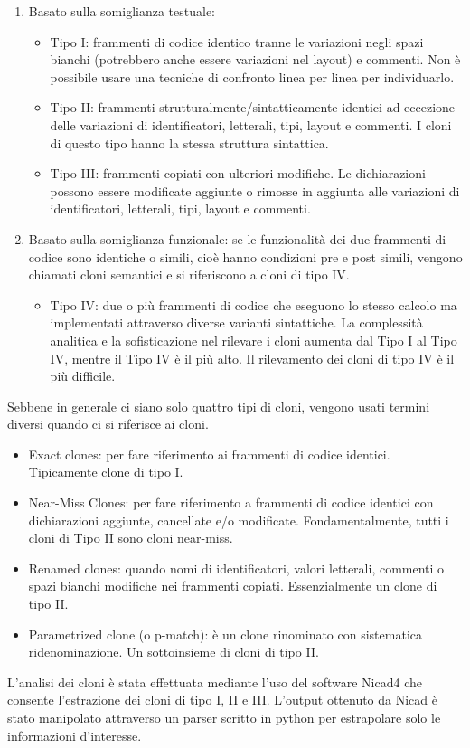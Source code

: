 \begin{enumerate}
\item Basato sulla somiglianza testuale:
\begin{itemize}
\item	Tipo I: frammenti di codice identico tranne le variazioni negli spazi bianchi (potrebbero anche essere variazioni nel layout) e commenti. Non è possibile usare una tecniche di confronto linea per linea per individuarlo.
\item	Tipo II: frammenti strutturalmente/sintatticamente identici ad eccezione delle variazioni di identificatori, letterali, tipi, layout e commenti. I cloni di questo tipo hanno la stessa struttura sintattica.
\item	Tipo III: frammenti copiati con ulteriori modifiche. Le dichiarazioni possono essere modificate aggiunte o rimosse in aggiunta alle variazioni di identificatori, letterali, tipi, layout e commenti.
\end{itemize}
\item Basato sulla somiglianza funzionale: se le funzionalità dei due frammenti di codice sono identiche o simili, cioè hanno condizioni pre e post simili, vengono chiamati cloni semantici e si riferiscono a cloni di tipo IV.
\begin{itemize}
\item	Tipo IV: due o più frammenti di codice che eseguono lo stesso calcolo ma implementati attraverso diverse varianti sintattiche. La complessità analitica e la sofisticazione nel rilevare i cloni aumenta dal Tipo I al Tipo IV, mentre il Tipo IV è il più alto. Il rilevamento dei cloni di tipo IV è il più difficile.
\end{itemize}
\end{enumerate}
Sebbene in generale ci siano solo quattro tipi di cloni, vengono usati termini diversi quando ci si riferisce ai cloni.
\begin{itemize}
\item	Exact clones: per fare riferimento ai frammenti di codice identici. Tipicamente clone di tipo I.
\item	Near-Miss Clones: per fare riferimento a frammenti di codice identici con dichiarazioni aggiunte, cancellate e/o modificate. Fondamentalmente, tutti i cloni di Tipo II sono cloni near-miss.
\item	Renamed clones: quando nomi di identificatori, valori letterali, commenti o spazi bianchi modifiche nei frammenti copiati. Essenzialmente un clone di tipo II.
\item	Parametrized clone (o p-match): è un clone rinominato con sistematica ridenominazione. Un sottoinsieme di cloni di tipo II.
\end{itemize}
L'analisi dei cloni è stata effettuata mediante l'uso del software Nicad4 che consente l'estrazione dei cloni di tipo I, II e III. L'output ottenuto da Nicad è stato manipolato attraverso un parser scritto in python per estrapolare solo le informazioni d'interesse.


